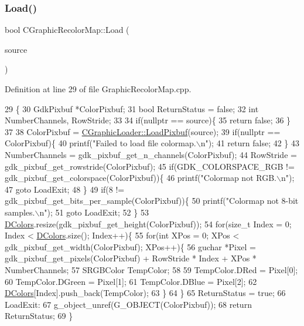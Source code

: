 \subsubsection{\texorpdfstring{Load()}{Load()}}
{\footnotesize\ttfamily bool C\+Graphic\+Recolor\+Map\+::\+Load (\begin{DoxyParamCaption}\item[{std\+::shared\+\_\+ptr$<$ \hyperlink{classCDataSource}{C\+Data\+Source} $>$}]{source }\end{DoxyParamCaption})}



Definition at line 29 of file Graphic\+Recolor\+Map.\+cpp.


\begin{DoxyCode}
29                                                                 \{
30     GdkPixbuf *ColorPixbuf;
31     \textcolor{keywordtype}{bool} ReturnStatus = \textcolor{keyword}{false};
32     \textcolor{keywordtype}{int} NumberChannels, RowStride;
33     
34     \textcolor{keywordflow}{if}(\textcolor{keyword}{nullptr} == source)\{
35         \textcolor{keywordflow}{return} \textcolor{keyword}{false};   
36     \}
37 
38     ColorPixbuf = \hyperlink{classCGraphicLoader_ac7778dec4fd0ea51674f0b23f3029edf}{CGraphicLoader::LoadPixbuf}(source);
39     \textcolor{keywordflow}{if}(\textcolor{keyword}{nullptr} == ColorPixbuf)\{
40         printf(\textcolor{stringliteral}{"Failed to load file colormap.\(\backslash\)n"});
41         \textcolor{keywordflow}{return} \textcolor{keyword}{false};
42     \}
43     NumberChannels = gdk\_pixbuf\_get\_n\_channels(ColorPixbuf);
44     RowStride = gdk\_pixbuf\_get\_rowstride(ColorPixbuf);
45     \textcolor{keywordflow}{if}(GDK\_COLORSPACE\_RGB != gdk\_pixbuf\_get\_colorspace(ColorPixbuf))\{
46         printf(\textcolor{stringliteral}{"Colormap not RGB.\(\backslash\)n"});
47         \textcolor{keywordflow}{goto} LoadExit;
48     \}
49     \textcolor{keywordflow}{if}(8 != gdk\_pixbuf\_get\_bits\_per\_sample(ColorPixbuf))\{
50         printf(\textcolor{stringliteral}{"Colormap not 8-bit samples.\(\backslash\)n"});
51         \textcolor{keywordflow}{goto} LoadExit;
52     \}
53     \hyperlink{classCGraphicRecolorMap_a9dea9a9e96e4465a53a40c4a34cebf71}{DColors}.resize(gdk\_pixbuf\_get\_height(ColorPixbuf));
54     \textcolor{keywordflow}{for}(\textcolor{keywordtype}{size\_t} Index = 0; Index < \hyperlink{classCGraphicRecolorMap_a9dea9a9e96e4465a53a40c4a34cebf71}{DColors}.size(); Index++)\{
55         \textcolor{keywordflow}{for}(\textcolor{keywordtype}{int} XPos = 0; XPos < gdk\_pixbuf\_get\_width(ColorPixbuf); XPos++)\{
56             guchar *Pixel = gdk\_pixbuf\_get\_pixels(ColorPixbuf) + RowStride * Index + XPos * NumberChannels;
57             SRGBColor TempColor;
58             
59             TempColor.DRed = Pixel[0];
60             TempColor.DGreen = Pixel[1];
61             TempColor.DBlue = Pixel[2];
62             \hyperlink{classCGraphicRecolorMap_a9dea9a9e96e4465a53a40c4a34cebf71}{DColors}[Index].push\_back(TempColor);
63         \}   
64     \}
65     ReturnStatus = \textcolor{keyword}{true};
66 LoadExit:
67     g\_object\_unref(G\_OBJECT(ColorPixbuf));
68     \textcolor{keywordflow}{return} ReturnStatus;
69 \}
\end{DoxyCode}
